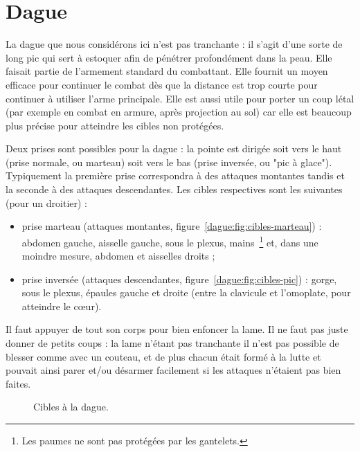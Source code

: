 \chapter{Dague}


La dague que nous considérons ici n'est pas tranchante : il s'agit d'une sorte de long pic qui sert à estoquer afin de pénétrer profondément dans la peau.
Elle faisait partie de l'armement standard du combattant.
Elle fournit un moyen efficace pour continuer le combat dès que la distance est trop courte pour continuer à utiliser l'arme principale.
Elle est aussi utile pour porter un coup létal (par exemple en combat en armure, après projection au sol) car elle est beaucoup plus précise pour atteindre les cibles non protégées.

Deux prises sont possibles pour la dague : la pointe est dirigée soit vers le haut (prise normale, ou marteau) soit vers le bas (prise inversée, ou "pic à glace").
Typiquement la première prise correspondra à des attaques montantes tandis et la seconde à des attaques descendantes.
Les cibles respectives sont les suivantes (pour un droitier) :
\begin{itemize}
	\item prise marteau (attaques montantes, figure~\ref{dague:fig:cibles-marteau}) : abdomen gauche, aisselle gauche, sous le plexus, mains~\footnote{Les paumes ne sont pas protégées par les gantelets.} et, dans une moindre mesure, abdomen et aisselles droits ;
	\item prise inversée (attaques descendantes, figure~\ref{dague:fig:cibles-pic}) : gorge, sous le plexus, épaules gauche et droite (entre la clavicule et l'omoplate, pour atteindre le cœur).
\end{itemize}
Il faut appuyer de tout son corps pour bien enfoncer la lame.
Il ne faut pas juste donner de petits coups : la lame n'étant pas tranchante il n'est pas possible de blesser comme avec un couteau, et de plus chacun était formé à la lutte et pouvait ainsi parer et/ou désarmer facilement si les attaques n'étaient pas bien faites.


\begin{figure}[ht]
	\centering
	\hspace{3cm}
	\caption{Cibles à la dague.}
	\label{dague:fig:cibles}
\end{figure}


